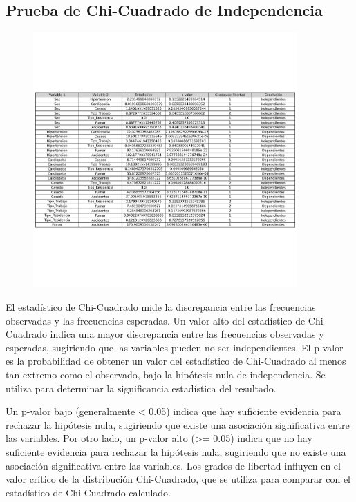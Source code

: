 \documentclass[a4paper, 12pt]{article}
\begin{document}
\subsection{Prueba de Chi-Cuadrado de Independencia}

\begin{figure}[H]
    \centering
    \includegraphics[width=0.9\textwidth]{img/Tablas/test_chi_cuadrado.png}
\end{figure}
El estadístico de Chi-Cuadrado mide la discrepancia entre las frecuencias observadas y las frecuencias esperadas. Un valor alto del estadístico de Chi-Cuadrado indica una mayor discrepancia entre las frecuencias observadas y esperadas, sugiriendo que las variables pueden no ser independientes. El p-valor es la probabilidad de obtener un valor del estadístico de Chi-Cuadrado al menos tan extremo como el observado, bajo la hipótesis nula de independencia. Se utiliza para determinar la significancia estadística del resultado.

Un p-valor bajo (generalmente < 0.05) indica que hay suficiente evidencia para rechazar la hipótesis nula, sugiriendo que existe una asociación significativa entre las variables. Por otro lado, un p-valor alto (>= 0.05) indica que no hay suficiente evidencia para rechazar la hipótesis nula, sugiriendo que no existe una asociación significativa entre las variables. Los grados de libertad influyen en el valor crítico de la distribución Chi-Cuadrado, que se utiliza para comparar con el estadístico de Chi-Cuadrado calculado.
\end{document}
